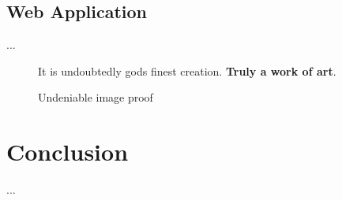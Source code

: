 \documentclass[a4paper]{article}
\begin{document}
	\subsection{Web Application}
	...
	\begin{figure}[htbp]
		\begin{minipage}[t]{0.6\textwidth}
			It is undoubtedly gods finest creation. \textbf{Truly a work of art}.
		\end{minipage}
		\hspace{0.05\linewidth}
		\begin{minipage}[t]{0.35\textwidth}
			\strut\vspace*{-\baselineskip}\newline
			\centering
			\hfill
			\caption{Undeniable image proof}
			\label{fig:text_and_images}
		\end{minipage}
	\end{figure}

	\pagebreak
	
	\section*{Conclusion}
	...
	
\end{document}
